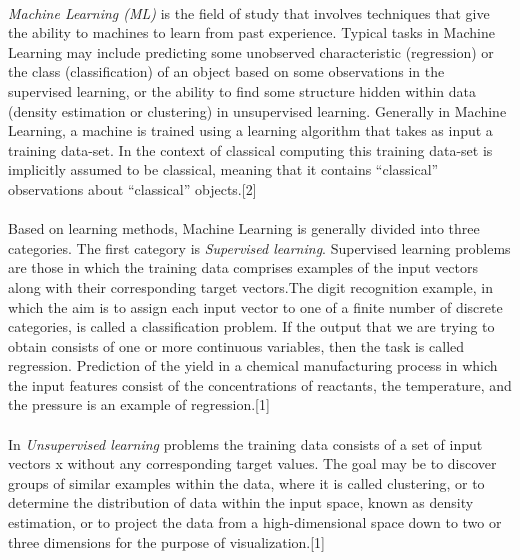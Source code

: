 \documentclass[hidelinks,12pt]{article}
\begin{document}
	\paragraph{}
	\textit{Machine Learning (ML)} is the field of study that involves techniques that give the ability to machines to learn from past experience. Typical tasks in Machine Learning may include predicting some unobserved characteristic (regression) or the class (classification) of an object based on some observations in the supervised learning, or the ability to find some structure hidden within data (density estimation or clustering) in unsupervised learning. Generally in Machine Learning, a machine is trained using a learning algorithm that takes as input a training data-set. In the context of classical computing this training data-set is implicitly assumed to be classical, meaning that it contains “classical” observations about “classical” objects.[2]
	\paragraph{}
	Based on learning methods, Machine Learning is generally divided into three categories. The first category is \textit{Supervised learning}. Supervised learning problems are those in which the training data comprises examples of the input vectors along with their corresponding target vectors.The digit recognition example, in which the aim is to assign each input vector to one of a finite number of discrete categories, is called a classification problem. If the output that we are trying to obtain consists of one or more continuous variables, then the task is called regression. Prediction of the yield in a chemical manufacturing process in which the input features consist of the concentrations of reactants, the temperature, and the pressure is an example of regression.[1]
	\paragraph{}
	In \textit{Unsupervised learning} problems the training data consists of a set of input vectors x without any corresponding target values. The goal may be to discover groups of similar examples within the data, where it is called clustering, or to determine the distribution of data within the input space, known as density estimation, or to project the data from a high-dimensional space down to two or three dimensions for the purpose of visualization.[1]
\end{document}
